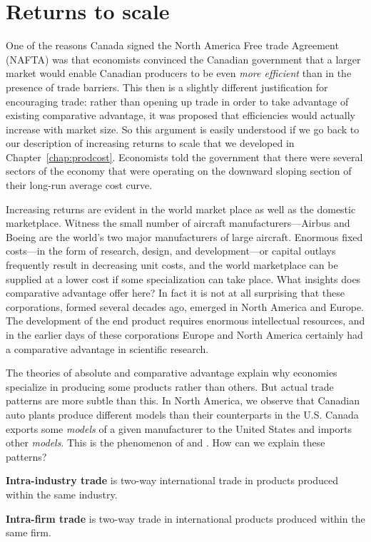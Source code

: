 \section{Returns to scale}\label{sec:ch15sec4}

One of the reasons Canada signed the North America Free trade Agreement (NAFTA) was that economists convinced the Canadian government that a larger market would enable Canadian producers to be even \textit{more efficient} than in the presence of trade barriers. This then is a slightly different justification for encouraging trade: rather than opening up trade in order to take advantage of existing comparative advantage, it was proposed that efficiencies would actually increase with market size. So this argument is easily understood if we go back to our description of increasing returns to scale that we developed in Chapter~\ref{chap:prodcost}. Economists told the government that there were several sectors of the economy that were operating on the downward sloping section of their long-run average cost curve.

Increasing returns are evident in the world market place as well as the domestic marketplace. Witness the small number of aircraft manufacturers---Airbus and Boeing are the world's two major manufacturers of large aircraft. Enormous fixed costs---in the form of research, design, and development---or capital outlays frequently result in decreasing unit costs, and the world marketplace can be supplied at a lower cost if some specialization can take place. What insights does comparative advantage offer here? In fact it is not at all surprising that these corporations, formed several decades ago, emerged in North America and Europe. The development of the end product requires enormous intellectual resources, and in the earlier days of these corporations Europe and North America certainly had a comparative advantage in scientific research.

The theories of absolute and comparative advantage explain why economies specialize in producing some products rather than others. But actual trade patterns are more subtle than this. In North America, we observe that Canadian auto plants produce different models than their counterparts in the U.S. Canada exports some \textit{models} of a given manufacturer to the United States and imports other \textit{models}. This is the phenomenon of  and . How can we explain these patterns?

\begin{DefBox}
\textbf{Intra-industry trade} is two-way international trade in products produced within the same industry.

\textbf{Intra-firm trade} is two-way trade in international products produced within the same firm.
\end{DefBox}

